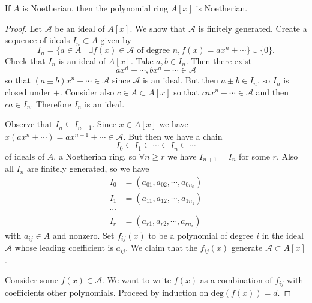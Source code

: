 \begin{theorem}
If $A$ is Noetherian, then the polynomial ring $A[x]$ is Noetherian.
\end{theorem}

\begin{proof}
Let $\mathcal{A}$ be an ideal of $A[x]$. We show that $\mathcal{A}$ is
finitely generated. Create a sequence of ideals $I_n \subset A$ given
by
$$
I_n = \{
         a \in A
      \mid
         \exists f(x) \in \mathcal{A} \text{ of degree } n,
                 f(x) = ax^n + \cdots
      \} \cup \{ 0 \}.
$$
Check that $I_n$ is an ideal of $A[x]$. Take
$a, b \in I_n$. Then there exist
$$
a x^n + \cdots, bx^n + \cdots \in \mathcal{A}
$$
so that $(a \pm b)x^n + \cdots \in \mathcal{A}$ since $\mathcal{A}$ is
an ideal. But then $a \pm b \in I_n$, so $I_n$ is closed under $+$. Consider
also $c \in A \subset A[x]$ so that $ca x^n + \cdots \in \mathcal{A}$
and then $ca \in I_n$. Therefore $I_n$ is an ideal.

Observe that $I_n \subseteq I_{n+1}$. Since $x \in A[x]$ we have
$x (a x^n + \cdots) = a x^{n+1} + \cdots \in \mathcal{A}$. But then
we have a chain
$$
I_0 \subseteq I_1 \subseteq \cdots \subseteq I_n \subseteq \cdots
$$
of ideals of $A$, a Noetherian ring,
so $\forall n \geq r$ we have $I_{n+1} = I_n$ for some $r$.
Also all $I_n$ are finitely generated, so we have
\begin{align*}
I_0 &= (a_{01}, a_{02}, \cdots, a_{0n_0}) \\
I_1 &= (a_{11}, a_{12}, \cdots, a_{1n_1}) \\
\cdots \\
I_r &= (a_{r1}, a_{r2}, \cdots, a_{rn_r})
\end{align*}
with $a_{ij} \in A$ and nonzero. Set
$f_{ij}(x)$ to be a polynomial of degree $i$ in the ideal
$\mathcal{A}$ whose leading coefficient is $a_{ij}$. We claim that
the $f_{ij}(x)$ generate $\mathcal{A} \subset A[x]$.

Consider some $f(x) \in \mathcal{A}$. We want to write
$f(x)$ as a combination of $f_{ij}$ with coefficients other
polynomials. Proceed by induction on $\mathrm{deg}(f(x)) = d$.


\end{proof}
